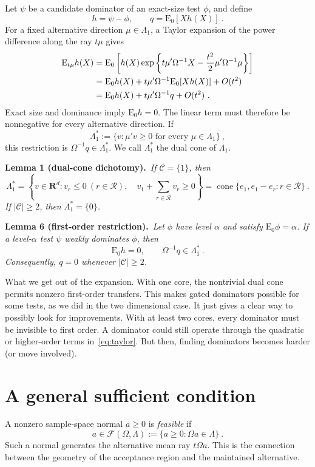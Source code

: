 \documentclass[11pt]{article}
\newcommand{\E}{\mathrm E}
\newcommand{\R}{\mathbf R}
\newcommand{\cC}{\mathcal C}
\newcommand{\cR}{\mathcal R}
\newcommand{\cF}{\mathcal F}
\newcommand{\1}{\mathbf 1}
\newcommand{\result}[2]{%
  \par\medskip\noindent
  \begingroup\color{navy}\textbf{#1.}\endgroup\ \emph{#2}\par\smallskip}
\begin{document}
Let $\psi$ be a candidate dominator of an exact-size test $\phi$, and define
\[
h=\psi-\phi,
\qquad
q=\E_0[Xh(X)]~.
\]
For a fixed alternative direction $\mu\in\Lambda_1$, a Taylor expansion of
the power difference along the ray $t\mu$ gives
\begin{align}
  \E_{t\mu}h(X)
  &=
  \E_0\left[
  h(X)\exp\left\{
  t\mu'\Omega^{-1}X
  -\frac{t^2}{2}\mu'\Omega^{-1}\mu
  \right\}
  \right] \notag \\
  &=
  \E_0h(X)
  +t\mu'\Omega^{-1}\E_0[Xh(X)]
  +O(t^2) \notag \\
  &=
  \E_0h(X)
  +t\mu'\Omega^{-1}q
  +O(t^2)~.\label{eq:taylor}
  \end{align}
Exact size and dominance imply $\E_0h=0$.  The linear term must therefore be
nonnegative for every alternative direction.  If
\[
\Lambda_1^*
:=
\{v:\mu'v\ge0\text{ for every }\mu\in\Lambda_1\}~,
\]
this restriction is $\Omega^{-1}q\in\Lambda_1^*$. We call $\Lambda_1^*$ the dual cone of $\Lambda_1$.

\result{Lemma 1 (dual-cone dichotomy)}{If $\cC=\{1\}$, then
\[
\Lambda_1^*
=
\left\{v\in\R^d:
v_r\le0\ (r\in\cR),\quad
v_1+\sum_{r\in\cR}v_r\ge0
\right\}
=\operatorname{cone}\{e_1,e_1-e_r:r\in\cR\}~.
\]
If $|\cC|\ge2$, then $\Lambda_1^*=\{0\}$.}

\result{Lemma 6 (first-order restriction)}{Let $\phi$ have level $\alpha$
and satisfy $\E_0\phi=\alpha$. If a level-$\alpha$ test $\psi$ weakly
dominates $\phi$, then
\[
\E_0h=0,
\qquad
\Omega^{-1}q\in\Lambda_1^*~.
\]
Consequently, $q=0$ whenever $|\cC|\ge2$.}

What we get out of the expansion.  With one
core, the nontrivial dual cone permits nonzero first-order transfers.  This
makes gated dominators possible for some tests, as we did in the two dimensional case. It just gives a clear way to possibly look for improvements. With at least two cores, every dominator must be invisible
to first order.  A dominator could still operate through the quadratic or
higher-order terms in~\eqref{eq:taylor}. But then, finding dominators becomes harder (or move involved).

\section{A general sufficient condition}

A nonzero sample-space normal $a\ge0$ is \emph{feasible} if
\[
a\in\cF(\Omega,\Lambda)
:=
\{a\ge0:\Omega a\in\Lambda\}~.
\]
Such a normal generates the alternative mean ray $t\Omega a$.  This is the
connection between the geometry of the acceptance region and the maintained
alternative.
\end{document}
